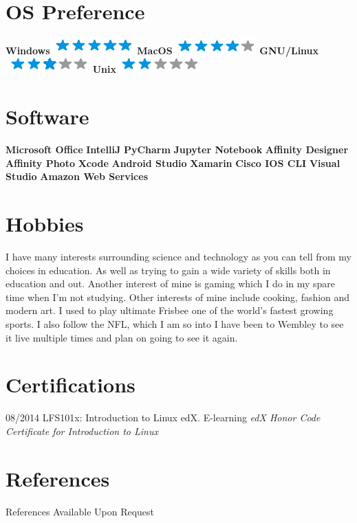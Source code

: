 \documentclass[]{friggeri-cv}
\begin{document}
\begin{aside}
~
~
~
  \section{OS Preference}
    \textbf{Windows}\includegraphics[scale=0.40]{img/5stars.png}
    \textbf{MacOS}\includegraphics[scale=0.40]{img/4stars.png}
    \textbf{GNU/Linux}\includegraphics[scale=0.40]{img/3stars.png}
    \textbf{Unix}\includegraphics[scale=0.40]{img/2stars.png}
    ~
  \section{Software}
\textbf{Microsoft Office}
\textbf{IntelliJ}
\textbf{PyCharm}
\textbf{Jupyter Notebook}
\textbf{Affinity Designer}
\textbf{Affinity Photo}
\textbf{Xcode}
\textbf{Android Studio}
\textbf{Xamarin}
\textbf{Cisco IOS CLI}
\textbf{Visual Studio}
\textbf{Amazon Web Services}
	~
\end{aside}

\section{Hobbies}
I have many interests surrounding science and technology as you can tell from my choices in
education. As well as trying to gain a wide variety of skills both in education and out. Another interest
of mine is gaming which I do in my spare time when I'm not studying. Other interests of mine include
cooking, fashion and modern art. I used to play ultimate Frisbee one of the world's fastest growing
sports. I also follow the NFL, which I am so into I have been to Wembley to see it live multiple times
and plan on going to see it again.
\\
\section{Certifications}
\begin{entrylist}
  \entry
    {08/2014}
    {LFS101x: Introduction to Linux}
    {edX. E-learning}
    {\emph{edX Honor Code Certificate for Introduction to Linux}}
\end{entrylist}

\section{References}
References Available Upon Request
\\
\end{document}

